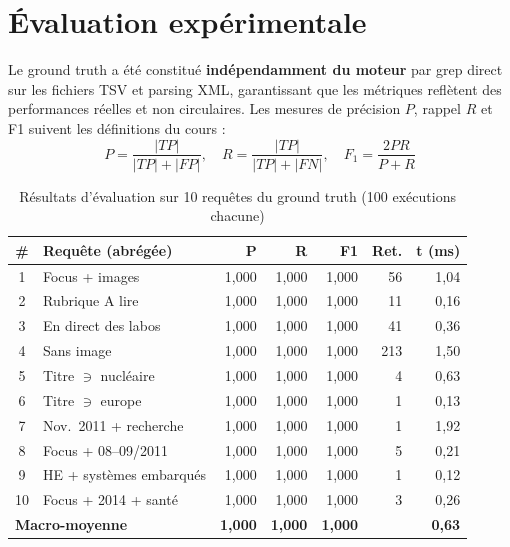\section{Évaluation expérimentale}

Le ground truth a été constitué \textbf{indépendamment du moteur} par grep direct sur
les fichiers TSV et parsing XML, garantissant que les métriques reflètent des performances
réelles et non circulaires. Les mesures de précision $P$, rappel $R$ et F1 suivent les
définitions du cours :
\begin{equation}
  P = \frac{|TP|}{|TP|+|FP|}, \quad
  R = \frac{|TP|}{|TP|+|FN|}, \quad
  F_1 = \frac{2PR}{P+R}
  \label{eq:prf1}
\end{equation}

\begin{table}[ht]
\centering
\caption{Résultats d'évaluation sur 10 requêtes du ground truth (100 exécutions chacune)}
\label{tab:eval}
\begin{tabular}{clrrrrr}
\toprule
\textbf{\#} & \textbf{Requête (abrégée)} & \textbf{P} & \textbf{R} & \textbf{F1}
  & \textbf{Ret.} & \textbf{t (ms)} \\
\midrule
1  & Focus + images          & 1,000 & 1,000 & 1,000 & 56  & 1,04 \\
2  & Rubrique A lire         & 1,000 & 1,000 & 1,000 & 11  & 0,16 \\
3  & En direct des labos     & 1,000 & 1,000 & 1,000 & 41  & 0,36 \\
4  & Sans image              & 1,000 & 1,000 & 1,000 & 213 & 1,50 \\
5  & Titre $\ni$ nucléaire   & 1,000 & 1,000 & 1,000 & 4   & 0,63 \\
6  & Titre $\ni$ europe      & 1,000 & 1,000 & 1,000 & 1   & 0,13 \\
7  & Nov.\ 2011 + recherche  & 1,000 & 1,000 & 1,000 & 1   & 1,92 \\
8  & Focus + 08–09/2011      & 1,000 & 1,000 & 1,000 & 5   & 0,21 \\
9  & HE + systèmes embarqués & 1,000 & 1,000 & 1,000 & 1   & 0,12 \\
10 & Focus + 2014 + santé    & 1,000 & 1,000 & 1,000 & 3   & 0,26 \\
\midrule
\multicolumn{2}{l}{\textbf{Macro-moyenne}}
  & \textbf{1,000} & \textbf{1,000} & \textbf{1,000} & & \textbf{0,63} \\
\bottomrule
\end{tabular}
\end{table}

